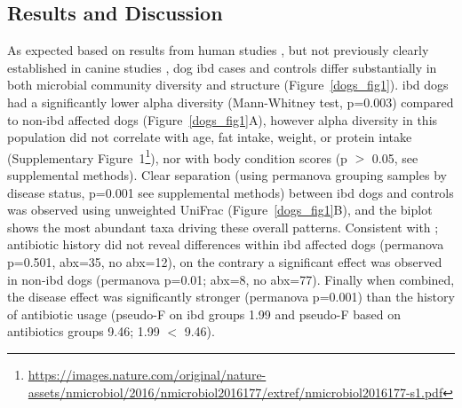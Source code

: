 \subsection{Results and Discussion}

As expected based on results from human studies \cite{RN3999, RN154}, but not previously clearly established in canine studies \cite{RN153, RN17138}, dog \gls{ibd} cases and controls differ substantially in both microbial community diversity and structure (Figure~\ref{dogs_fig1}). \gls{ibd} dogs had a significantly lower alpha diversity (Mann-Whitney test, p=0.003) compared to non-\gls{ibd} affected dogs (Figure~\ref{dogs_fig1}A), however alpha diversity in this population did not correlate with age, fat intake, weight, or protein intake (Supplementary Figure~1\footnote{\url{https://images.nature.com/original/nature-assets/nmicrobiol/2016/nmicrobiol2016177/extref/nmicrobiol2016177-s1.pdf}}), nor with body condition scores (p $>$ 0.05, see supplemental methods). Clear separation (using \gls{permanova} grouping samples by disease status, p=0.001 see supplemental methods) between \gls{ibd} dogs and controls was observed using unweighted UniFrac (Figure~\ref{dogs_fig1}B), and the biplot shows the most abundant taxa driving these overall patterns. Consistent with \cite{RN153}; antibiotic history did not reveal differences within \gls{ibd} affected dogs (\gls{permanova} p=0.501, abx=35, no abx=12), on the contrary a significant effect was observed in non-\gls{ibd} dogs (\gls{permanova} p=0.01; abx=8, no abx=77). Finally when combined, the disease effect was significantly stronger (\gls{permanova} p=0.001) than the history of antibiotic usage (pseudo-F on \gls{ibd} groups 1.99 and pseudo-F based on antibiotics groups 9.46; 1.99 $<$ 9.46).

